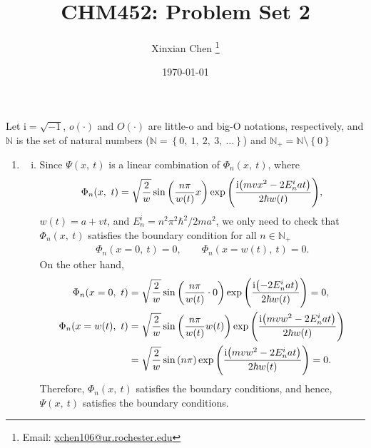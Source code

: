\documentclass{article}
\title{CHM452: Problem Set 2}
\author{Xinxian Chen%
\footnote{Email: \href{mailto:xchen106@ur.rochester.edu}{xchen106@ur.rochester.edu}}}
\date{\today}
\newcommand{\iu}{\ensuremath{\mathrm{i}}}
\newcommand{\set}[1]{\ensuremath{\left\{{#1}\right\}}}
\begin{document}
\maketitle

Let $\iu = \sqrt{-1}$, $o(\cdot)$ and $O(\cdot)$ are little-o and big-O notations, respectively, and $\mathbb{N}$ is the set of natural numbers ($\mathbb{N} = \set{0,\ 1,\ 2,\ 3,\ \ldots}$) and $\mathbb{N}_+ = \mathbb{N}\setminus\set{0}$

\begin{enumerate}[1.]
  \item 
  \begin{enumerate}[(i)]
    \item Since $\Psi(x,\ t)$ is a linear combination of $\Phi_n(x,\ t)$, where
    \begin{align*}
      \Phi_n(x,\ t) = \sqrt{\frac{2}{w}}\sin\qty(\frac{n\pi}{w(t)}x)\exp\qty(\frac{\iu\qty(mvx^2 - 2E_n^iat)}{2\hbar w(t)}),
    \end{align*}
    $w(t) =a + vt$, and $E_n^i = n^2\pi^2\hbar^2/2ma^2$, we only need to check that $\Phi_n(x,\ t)$ satisfies the boundary condition for all $n \in \mathbb{N}_+$
    \begin{align*}
      \Phi_n(x=0,\ t) = 0, \qquad \Phi_n(x=w(t),\ t) = 0.
    \end{align*}
    On the other hand,
    \begin{align*}
      \Phi_n(x=0,\ t) &= \sqrt{\frac{2}{w}}\sin\qty(\frac{n\pi}{w(t)} \cdot 0)\exp\qty(\frac{\iu\qty(- 2E_n^iat)}{2\hbar w(t)}) = 0,\\
      \Phi_n(x=w(t),\ t) &= \sqrt{\frac{2}{w}}\sin\qty(\frac{n\pi}{w(t)} w(t))\exp\qty(\frac{\iu\qty(mvw^2 - 2E_n^iat)}{2\hbar w(t)}) \\
      &=\sqrt{\frac{2}{w}}\sin\qty(n \pi)\exp\qty(\frac{\iu\qty(mvw^2 - 2E_n^iat)}{2\hbar w(t)}) = 0.
    \end{align*}
    Therefore, $\Phi_n(x,\ t)$ satisfies the boundary conditions, and hence, $\Psi(x,\ t)$ satisfies the boundary conditions.


\end{enumerate}
\end{enumerate}
\end{document}
